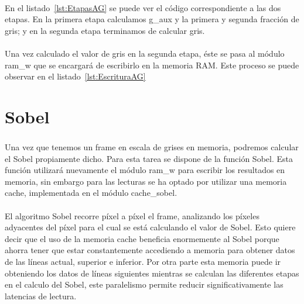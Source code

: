 \documentclass[a4paper,12pt,titlepage,final]{book}
\begin{document}
\paragraph{}
En el listado~\ref{lst:EtapasAG} se puede ver el código correspondiente a las dos etapas. En la primera etapa calculamos g\_aux y la primera y segunda fracción de gris; y en la segunda etapa terminamos de calcular gris.



\paragraph{}
Una vez calculado el valor de gris en la segunda etapa, éste se pasa al módulo ram\_w que se encargará de escribirlo en la memoria RAM. Este proceso se puede observar en el listado~\ref{lst:EscrituraAG}



\section{Sobel}
\subsubsection*{}
\paragraph{}
Una vez que tenemos un frame en escala de grises en memoria, podremos calcular el Sobel propiamente dicho. Para esta tarea se dispone de la función Sobel. Esta función utilizará nuevamente el módulo ram\_w para escribir los resultados en memoria, sin embargo para las lecturas se ha optado por utilizar una memoria cache, implementada en el módulo cache\_sobel.

\paragraph{}
El algoritmo Sobel recorre píxel a píxel el frame, analizando los píxeles adyacentes del píxel para el cual se está calculando el valor de Sobel. Esto quiere decir que el uso de la memoria cache beneficia enormemente al Sobel porque ahorra tener que estar constantemente accediendo a memoria para obtener datos de las líneas actual, superior e inferior. Por otra parte esta memoria puede ir obteniendo los datos de líneas siguientes mientras se calculan las diferentes etapas en el calculo del Sobel, este paralelismo permite reducir significativamente las latencias de lectura.
\end{document}
